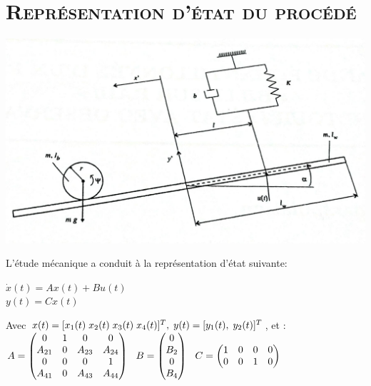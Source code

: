 \break
\chapter{\textsc{Représentation d'état du procédé }}

	\begin{center}
	\includegraphics[scale=0.2]{procede.jpg}
	\label{fig2} 
	\end{center}	
L'étude mécanique a conduit à la représentation d'état suivante:\\

	\begin{center}
		$ \dot{x}(t)=Ax(t)+Bu(t)$ \\[0.25 cm]
		$y(t)=Cx(t) $

	\end{center}
Avec $x(t)=[x_1(t) \hspace{1 mm} x_2(t) \hspace{1 mm} x_3(t) \hspace{1 mm} x_4(t)]^T, \hspace{1 mm} y(t) = [y_1(t), \hspace{1 mm} y_2(t)]^T $, et :\\

$A = \begin{pmatrix}
	0 & 1 & 0 & 0 \\
	A_{21} & 0 & A_{23} & A_{24} \\
	0 & 0 & 0 & 1 \\
	A_{41} & 0 & A_{43} & A_{44}  
\end{pmatrix} \hspace{0.25 cm} B = \begin{pmatrix}
	0 \\
	B_2 \\
	0 \\
	B_4  
\end{pmatrix} \hspace{0.25 cm} C = \begin{pmatrix}
	1 & 0 & 0 & 0 \\
	0 & 0 & 1 & 0 
\end{pmatrix}$

